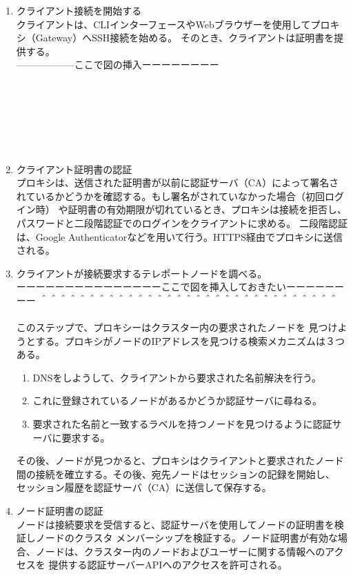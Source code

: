 \documentclass[12pt,a4paper,titlepage]{jsarticle}
\begin{document}
\begin{enumerate}[1:]

    \item クライアント接続を開始する\mbox{}\\クライアントは、CLIインターフェースやWebブラウザーを使用してプロキシ（Gateway）へSSH接続を始める。
    そのとき、クライアントは証明書を提供する。\\
    ------------------ここで図の挿入ーーーーーーーー\\\\\\\\\\\\\\

    \item クライアント証明書の認証\mbox{}\\
    プロキシは、送信された証明書が以前に認証サーバ（CA）によって署名されているかどうかを確認する。もし署名がされていなかった場合（初回ログイン時）
    や証明書の有効期限が切れているとき、プロキシは接続を拒否し、パスワードと二段階認証でのログインをクライアントに求める。
    二段階認証は、Google Authenticatorなどを用いて行う。HTTPS経由でプロキシに送信される。
    
    \item クライアントが接続要求するテレポートノードを調べる。\mbox{}\\
    ーーーーーーーーーーーーーーーここで図を挿入しておきたいーーーーーーーー
    ＾＾＾＾＾＾＾＾＾＾＾＾＾＾＾＾＾＾＾＾＾＾＾＾＾＾＾＾＾＾＾\\\\


    このステップで、プロキシーはクラスター内の要求されたノードを
    見つけようとする。プロキシがノードのIPアドレスを見つける検索メカニズムは３つある。
    \begin{enumerate}[(1)]
        \item DNSをしようして、クライアントから要求された名前解決を行う。
        \item これに登録されているノードがあるかどうか認証サーバに尋ねる。
        \item 要求された名前と一致するラベルを持つノードを見つけるように認証サーバに要求する。
    \end{enumerate}
    その後、ノードが見つかると、プロキシはクライアントと要求されたノード間の接続を確立する。その後、宛先ノードはセッションの記録を開始し、
    セッション履歴を認証サーバ（CA）に送信して保存する。
    \item ノード証明書の認証\mbox{}\\ノードは接続要求を受信すると、認証サーバを使用してノードの証明書を検証しノードのクラスタ
    メンバーシップを検証する。ノード証明書が有効な場合、ノードは、クラスター内のノードおよびユーザーに関する情報へのアクセスを
    提供する認証サーバーAPIへのアクセスを許可される。


\end{enumerate}
\end{document}
